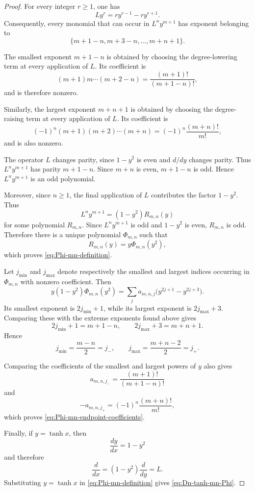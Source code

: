 \documentclass[11pt,twoside]{article}
\numberwithin{equation}{section}
\begin{document}
\begin{proof}
For every integer \(r\geq1\), one has
\[
Ly^r
=
r y^{r-1}-r y^{r+1}.
\]
Consequently, every monomial that can occur in \(L^n y^{m+1}\) has
exponent belonging to
\[
\{m+1-n,m+3-n,\ldots,m+n+1\}.
\]

The smallest exponent \(m+1-n\) is obtained by choosing the
degree-lowering term at every application of \(L\). Its coefficient is
\[
(m+1)m\cdots(m+2-n)
=
\frac{(m+1)!}{(m+1-n)!},
\]
and is therefore nonzero.

Similarly, the largest exponent \(m+n+1\) is obtained by choosing the
degree-raising term at every application of \(L\). Its coefficient is
\[
(-1)^n(m+1)(m+2)\cdots(m+n)
=
(-1)^n\frac{(m+n)!}{m!},
\]
and is also nonzero.

The operator \(L\) changes parity, since \(1-y^2\) is even and
\(d/dy\) changes parity. Thus \(L^n y^{m+1}\) has parity \(m+1-n\).
Since \(m+n\) is even, \(m+1-n\) is odd. Hence \(L^n y^{m+1}\) is an
odd polynomial.

Moreover, since \(n\geq1\), the final application of \(L\) contributes
the factor \(1-y^2\). Thus
\[
L^n y^{m+1}
=
(1-y^2)R_{m,n}(y)
\]
for some polynomial \(R_{m,n}\). Since \(L^n y^{m+1}\) is odd and
\(1-y^2\) is even, \(R_{m,n}\) is odd. Therefore there is a unique
polynomial \(\Phi_{m,n}\) such that
\[
R_{m,n}(y)
=
y\Phi_{m,n}(y^2),
\]
which proves \eqref{eq:Phi-mn-definition}.

Let \(j_{\min}\) and \(j_{\max}\) denote respectively the smallest and
largest indices occurring in \(\Phi_{m,n}\) with nonzero coefficient.
Then
\[
y(1-y^2)\Phi_{m,n}(y^2)
=
\sum_j a_{m,n,j}
\bigl(y^{2j+1}-y^{2j+3}\bigr).
\]
Its smallest exponent is \(2j_{\min}+1\), while its largest exponent is
\(2j_{\max}+3\). Comparing these with the extreme exponents found above
gives
\[
2j_{\min}+1=m+1-n,
\qquad
2j_{\max}+3=m+n+1.
\]
Hence
\[
j_{\min}
=
\frac{m-n}{2}
=
j_-,
\qquad
j_{\max}
=
\frac{m+n-2}{2}
=
j_+.
\]

Comparing the coefficients of the smallest and largest powers of \(y\)
also gives
\[
a_{m,n,j_-}
=
\frac{(m+1)!}{(m+1-n)!}
\]
and
\[
-a_{m,n,j_+}
=
(-1)^n\frac{(m+n)!}{m!},
\]
which proves \eqref{eq:Phi-mn-endpoint-coefficients}.

Finally, if \(y=\tanh x\), then
\[
\frac{dy}{dx}
=
1-y^2
\]
and therefore
\[
\frac{d}{dx}
=
(1-y^2)\frac{d}{dy}
=
L.
\]
Substituting \(y=\tanh x\) in \eqref{eq:Phi-mn-definition} gives
\eqref{eq:Dn-tanh-mn-Phi}.
\end{proof}
\end{document}

